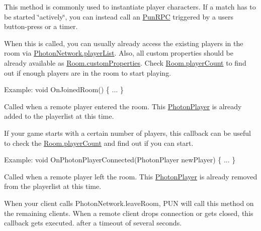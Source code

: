 \begin{Desc}
\begin{description}
This method is commonly used to instantiate player characters. If a match has to be started \char`\"{}actively\char`\"{}, you can instead call an \hyperlink{class_photon_view_ad288db13a15d581e0f7c5886f4036720}{Pun\+R\+PC} triggered by a user\textquotesingle{}s button-\/press or a timer.

When this is called, you can usually already access the existing players in the room via \hyperlink{class_photon_network_a2dc5e6cba79f899d9952f804db35b2f3}{Photon\+Network.\+player\+List}. Also, all custom properties should be already available as \hyperlink{class_room_info_a928b103a3e88d2c090152440aa6fa874}{Room.\+custom\+Properties}. Check \hyperlink{class_room_aa9d85e54b2ff1b151de3670e87549966}{Room.\+player\+Count} to find out if enough players are in the room to start playing.

Example\+: void On\+Joined\+Room() \{ ... \} \item[{\em 
On\+Photon\+Player\+Connected\hypertarget{group__public_api_ggaf30bbea51cc8c4b1ddc239d1c5c1468faccfd8b0940a4981818cc4147e29de834}{}\label{group__public_api_ggaf30bbea51cc8c4b1ddc239d1c5c1468faccfd8b0940a4981818cc4147e29de834}
}]Called when a remote player entered the room. This \hyperlink{class_photon_player}{Photon\+Player} is already added to the playerlist at this time. 

If your game starts with a certain number of players, this callback can be useful to check the \hyperlink{class_room_aa9d85e54b2ff1b151de3670e87549966}{Room.\+player\+Count} and find out if you can start.

Example\+: void On\+Photon\+Player\+Connected(\+Photon\+Player new\+Player) \{ ... \} \item[{\em 
On\+Photon\+Player\+Disconnected\hypertarget{group__public_api_ggaf30bbea51cc8c4b1ddc239d1c5c1468fa39b1e276b8dab1e7620a643b7e01d71c}{}\label{group__public_api_ggaf30bbea51cc8c4b1ddc239d1c5c1468fa39b1e276b8dab1e7620a643b7e01d71c}
}]Called when a remote player left the room. This \hyperlink{class_photon_player}{Photon\+Player} is already removed from the playerlist at this time. 

When your client calls Photon\+Network.\+leave\+Room, P\+UN will call this method on the remaining clients. When a remote client drops connection or gets closed, this callback gets executed. after a timeout of several seconds.


\end{description}
\end{Desc}
